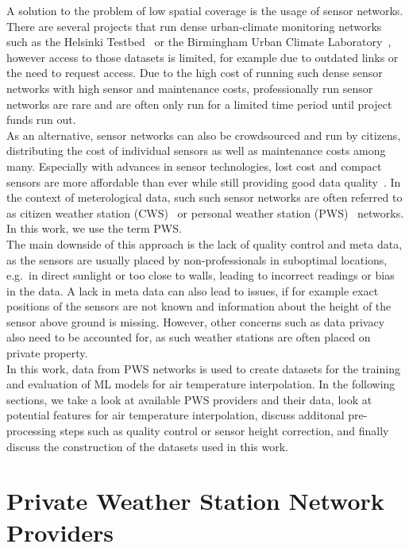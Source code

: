 A solution to the problem of low spatial coverage is the usage of sensor networks. There are several projects that run dense urban-climate monitoring networks~\cite{muller2013sensors} such as the Helsinki Testbed~\cite{koskinen2011helsinki} or the Birmingham Urban Climate Laboratory~\cite{warren2016birmingham}, however access to those datasets is limited, for example due to outdated links or the need to request access. Due to the high cost of running such dense sensor networks with high sensor and maintenance costs, professionally run sensor networks are rare and are often only run for a limited time period until project funds run out.\\
As an alternative, sensor networks can also be crowdsourced and run by citizens, distributing the cost of individual sensors as well as maintenance costs among many. Especially with advances in sensor technologies, lost cost and compact sensors are more affordable than ever while still providing good data quality~\cite{grimmond2006progress, rundel2009environmental}. In the context of meterological data, such such sensor networks are often referred to as citizen weather station (CWS)~\cite{meier2017crowdsourcing} or personal weather station (PWS)~\cite{hahn2022observations} networks. In this work, we use the term PWS.\\
The main downside of this approach is the lack of quality control and meta data, as the sensors are usually placed by non-professionals in suboptimal locations, e.g.\ in direct sunlight or too close to walls, leading to incorrect readings or bias in the data. A lack in meta data can also lead to issues, if for example exact positions of the sensors are not known and information about the height of the sensor above ground is missing. However, other concerns such as data privacy also need to be accounted for, as such weather stations are often placed on private property.\\
In this work, data from PWS networks is used to create datasets for the training and evaluation of ML models for air temperature interpolation. In the following sections, we take a look at available PWS providers and their data, look at potential features for air temperature interpolation, discuss additonal pre-processing steps such as quality control or sensor height correction, and finally discuss the construction of the datasets used in this work.

\section{Private Weather Station Network Providers}
\label{sec: private weather station network providers}

